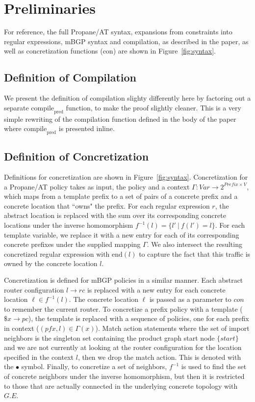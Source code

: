\documentclass[twocolumn, openany]{sig-alternate-10pt}
\newcommand{\sysname}{{\small \sf Propane/AT}\xspace}
\newcommand{\Con}{\mathrm{con}}
\newcommand{\CompilePred}{\ensuremath{\mathrm{compile}_\mathrm{pred}}}
\begin{document}
\section{Preliminaries}

For reference, the full \sysname syntax, expansions from constraints into regular expressions, mBGP syntax and compilation, as described in the paper, as well as concretization functions ($\Con$) are shown in Figure~\ref{fig:syntax}.

\subsection{Definition of Compilation}

We present the definition of compilation slighty differently here by factoring out a separate $\CompilePred$ function, to make the proof slightly cleaner. This is a very simple rewriting of the compilation function defined in the body of the paper where $\CompilePred$ is presented inline.

\subsection{Definition of Concretization}

Definitions for concretization are shown in Figure~\ref{fig:syntax}. Concretization for a \sysname policy takes as input, the policy and a context
$\Gamma : Var \rightarrow 2^{Prefix \times V}$,
which maps from a template prefix to a set of pairs of a concrete prefix and a concrete location that ``owns" the prefix.
%
For each regular expression $r$, the abstract location is replaced with the sum over its corresponding concrete locations under the inverse homomorphism $f^{-1}(l) = \{ l' ~\vert~ f(l') = l \}$. For each template variable, we replace it with a new entry for each of its corresponding concrete prefixes under the supplied mapping $\Gamma$. We also intersect the resulting concretized regular expression with $\text{end}(l)$ to capture the fact that this traffic is owned by the concrete location $l$.%

Concretization is defined for mBGP policies in a similar manner. Each abstract router configuration $l \rightarrow rc$ is replaced with a new entry for each concrete location $\ell \in f^{-1}(l)$. The concrete location $\ell$ is passed as a parameter to $con$ to remember the current router.
%
To concretize a prefix policy with a template ($\$x \rightarrow pc$), the template is replaced with a sequence of policies, one for each prefix in context ($(pfx,l) \in \Gamma(x)$). Match action statements where the set of import neighbors is the singleton set containing the product graph start node $\{ start \}$ and we are not currently at looking at the router configuration for the location specified in the context $l$, then we drop the match action. This is denoted with the $\bullet$ symbol. Finally, to concretize a set of neighbors, $f^{-1}$ is used to find the set of concrete neighbors under the inverse homomorphism, but then it is restricted to those that are actually connected in the underlying concrete topology with $G.E$.
\end{document}
